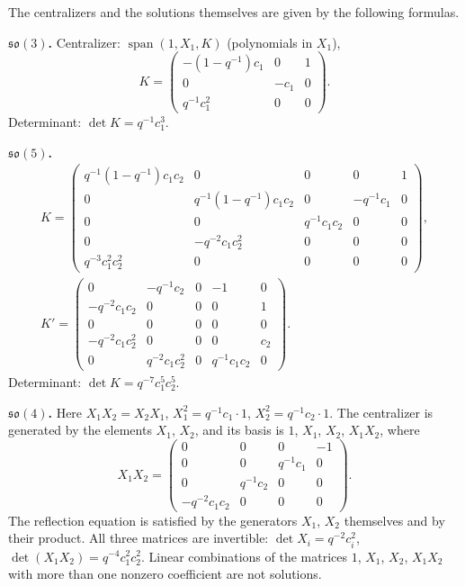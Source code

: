 \documentclass[12pt,a4paper]{article}
\newcommand{\so}{\mathfrak{so}}
\newcommand{\spn}{\operatorname{span}}
\begin{document}
The centralizers and the solutions themselves are given by the following formulas.

\textbf{$\so(3)$.} Centralizer: $\spn(1,X_1,K)$ (polynomials in $X_1$),
\begin{equation}  \label{Kso(3)}
K=\begin{pmatrix}
-(1-q^{-1})c_1 & 0 & 1 \\
0 & -c_1 & 0 \\
q^{-1}c_1^{2} & 0 & 0
\end{pmatrix}.
\end{equation}
Determinant: $\det K=q^{-1}c_1^3$.

\textbf{$\so(5)$.}
\begin{gather}
K=\begin{pmatrix} \label{Kso(5)}
q^{-1}(1-q^{-1})c_1c_2 & 0 & 0 & 0 & 1 \\
0 & q^{-1}(1-q^{-1})c_1c_2 & 0 & -q^{-1}c_1 & 0 \\
0 & 0 & q^{-1}c_1c_2 & 0 & 0 \\
0 & -q^{-2}c_1c_2^{2} & 0 & 0 & 0 \\
q^{-3}c_1^{2}c_2^{2} & 0 & 0 & 0 & 0
\end{pmatrix},\\[4pt]
K'=\begin{pmatrix} \nonumber
0 & -q^{-1}c_2 & 0 & -1 & 0 \\
-q^{-2}c_1c_2 & 0 & 0 & 0 & 1 \\
0 & 0 & 0 & 0 & 0 \\
-q^{-2}c_1c_2^{2} & 0 & 0 & 0 & c_2 \\
0 & q^{-2}c_1c_2^{2} & 0 & q^{-1}c_1c_2 & 0
\end{pmatrix}.
\end{gather}
Determinant: $\det K=q^{-7}c_1^5c_2^5$.

\textbf{$\so(4)$.} Here $X_1X_2=X_2X_1$, $X_1^2=q^{-1}c_1\cdot1$, $X_2^2=q^{-1}c_2\cdot1$. The centralizer is generated by the elements $X_1$, $X_2$, and its basis is
$1$, $X_1$, $X_2$, $X_1X_2$, where
\begin{equation}  \label{Kso(4)}
X_1X_2=\begin{pmatrix}
0 & 0 & 0 & -1 \\
0 & 0 & q^{-1}c_1 & 0 \\
0 & q^{-1}c_2 & 0 & 0 \\
-q^{-2}c_1c_2 & 0 & 0 & 0
\end{pmatrix}.
\end{equation}
The reflection equation is satisfied by the generators $X_1$, $X_2$ themselves and by their product. All three matrices are invertible: $\det X_i=q^{-2}c_i^2$, $\det(X_1X_2)=q^{-4}c_1^2c_2^2$. Linear
combinations of the matrices $1$, $X_1$, $X_2$, $X_1X_2$ with more than one nonzero coefficient are not solutions.
\end{document}
